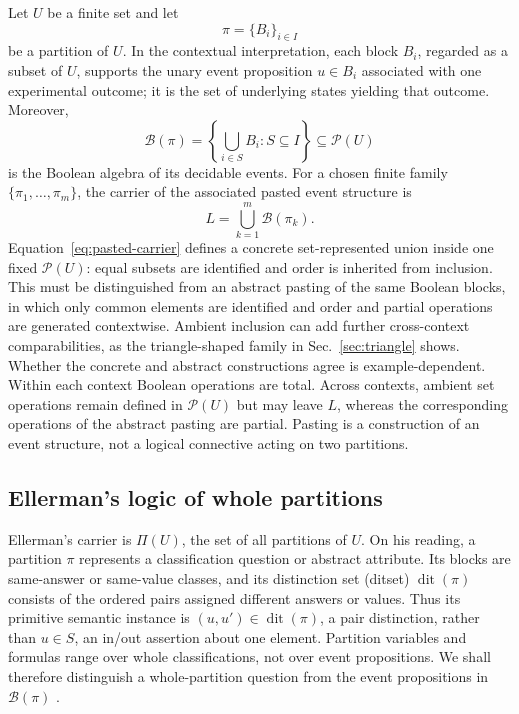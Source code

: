 \documentclass[aps,pra,reprint,nofootinbib]{revtex4-2}
\newcommand{\Pow}{\mathcal{P}}
\newcommand{\Part}{\Pi}
\newcommand{\BA}{\mathcal{B}}
\newcommand{\dit}{\operatorname{dit}}
\begin{document}
Let $U$ be a finite set and let
\begin{equation}
  \pi=\{B_i\}_{i\in I}
\end{equation}
be a partition of $U$.  In the contextual interpretation, each block $B_i$,
regarded as a subset of $U$, supports the unary event proposition $u\in B_i$
associated with one experimental outcome; it is the set of underlying states
yielding that outcome.  Moreover,
\begin{equation}
  \BA(\pi)=
  \left\{\bigcup_{i\in S}B_i:S\subseteq I\right\}
  \subseteq\Pow(U)
  \label{eq:generated-ba}
\end{equation}
is the Boolean algebra of its decidable events.  For a chosen finite family
$\{\pi_1,\ldots,\pi_m\}$, the carrier of the associated pasted event structure is
\begin{equation}
  L=\bigcup_{k=1}^{m}\BA(\pi_k).
  \label{eq:pasted-carrier}
\end{equation}
  Equation~\eqref{eq:pasted-carrier} defines a concrete set-represented union
  inside one fixed $\Pow(U)$: equal subsets are identified and order is inherited
  from inclusion.  This must be distinguished from an abstract pasting of the
  same Boolean blocks, in which only common elements are identified and order
  and partial operations are generated contextwise.  Ambient inclusion can add
  further cross-context comparabilities, as the triangle-shaped family in
  Sec.~\ref{sec:triangle} shows.  Whether the concrete and abstract
  constructions agree is example-dependent.
  Within each context Boolean operations are total.  Across contexts, ambient
  set operations remain defined in $\Pow(U)$ but may leave $L$, whereas the
  corresponding operations of the abstract pasting are partial.  Pasting is a
  construction of an event structure, not a logical connective acting on two
  partitions.

\subsection{Ellerman's logic of whole partitions}

Ellerman's carrier is $\Part(U)$, the set of all partitions of $U$.  On his
reading, a partition $\pi$ represents a classification question or abstract
attribute.  Its blocks are same-answer or same-value classes, and its
distinction set (ditset) $\dit(\pi)$ consists of the ordered pairs assigned
different answers or values.  Thus its primitive semantic instance is
$(u,u')\in\dit(\pi)$, a pair distinction, rather than $u\in S$, an in/out
assertion about one element.  Partition variables and formulas range over
whole classifications, not over event propositions.  We shall therefore
distinguish a whole-partition question from the event propositions in
$\BA(\pi)$
\cite{ellerman-2010-partition-logic,ellerman-2014-introduction}.
\end{document}
